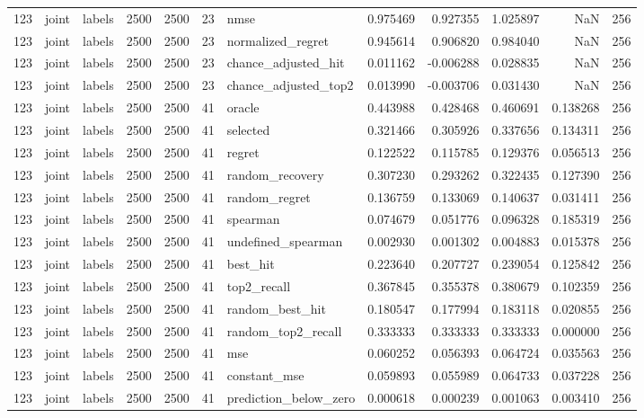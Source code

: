 \begin{tabular}{rllrrrlrrrrr}
123 & joint & labels & 2500 & 2500 & 23 & nmse & 0.975469 & 0.927355 & 1.025897 & NaN & 256 \\
123 & joint & labels & 2500 & 2500 & 23 & normalized_regret & 0.945614 & 0.906820 & 0.984040 & NaN & 256 \\
123 & joint & labels & 2500 & 2500 & 23 & chance_adjusted_hit & 0.011162 & -0.006288 & 0.028835 & NaN & 256 \\
123 & joint & labels & 2500 & 2500 & 23 & chance_adjusted_top2 & 0.013990 & -0.003706 & 0.031430 & NaN & 256 \\
123 & joint & labels & 2500 & 2500 & 41 & oracle & 0.443988 & 0.428468 & 0.460691 & 0.138268 & 256 \\
123 & joint & labels & 2500 & 2500 & 41 & selected & 0.321466 & 0.305926 & 0.337656 & 0.134311 & 256 \\
123 & joint & labels & 2500 & 2500 & 41 & regret & 0.122522 & 0.115785 & 0.129376 & 0.056513 & 256 \\
123 & joint & labels & 2500 & 2500 & 41 & random_recovery & 0.307230 & 0.293262 & 0.322435 & 0.127390 & 256 \\
123 & joint & labels & 2500 & 2500 & 41 & random_regret & 0.136759 & 0.133069 & 0.140637 & 0.031411 & 256 \\
123 & joint & labels & 2500 & 2500 & 41 & spearman & 0.074679 & 0.051776 & 0.096328 & 0.185319 & 256 \\
123 & joint & labels & 2500 & 2500 & 41 & undefined_spearman & 0.002930 & 0.001302 & 0.004883 & 0.015378 & 256 \\
123 & joint & labels & 2500 & 2500 & 41 & best_hit & 0.223640 & 0.207727 & 0.239054 & 0.125842 & 256 \\
123 & joint & labels & 2500 & 2500 & 41 & top2_recall & 0.367845 & 0.355378 & 0.380679 & 0.102359 & 256 \\
123 & joint & labels & 2500 & 2500 & 41 & random_best_hit & 0.180547 & 0.177994 & 0.183118 & 0.020855 & 256 \\
123 & joint & labels & 2500 & 2500 & 41 & random_top2_recall & 0.333333 & 0.333333 & 0.333333 & 0.000000 & 256 \\
123 & joint & labels & 2500 & 2500 & 41 & mse & 0.060252 & 0.056393 & 0.064724 & 0.035563 & 256 \\
123 & joint & labels & 2500 & 2500 & 41 & constant_mse & 0.059893 & 0.055989 & 0.064733 & 0.037228 & 256 \\
123 & joint & labels & 2500 & 2500 & 41 & prediction_below_zero & 0.000618 & 0.000239 & 0.001063 & 0.003410 & 256 \\

\end{tabular}
